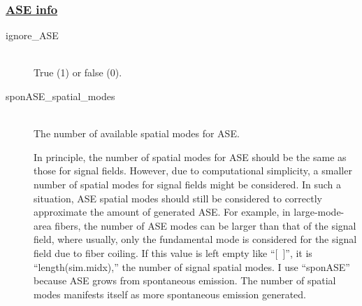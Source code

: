 \documentclass[12pt,hidelinks]{book}
\begin{document}
\subsubsection{\underline{ASE info}}
\begin{description}
\item[\color{blue}ignore\_ASE]\mbox{}\\
True (1) or false (0).

\item[\color{blue}sponASE\_spatial\_modes]\mbox{}\\
The number of available spatial modes for ASE.

In principle, the number of spatial modes for ASE should be the same as those for signal fields. However, due to computational simplicity, a smaller number of spatial modes for signal fields might be considered. In such a situation, ASE spatial modes should still be considered to correctly approximate the amount of generated ASE. For example, in large-mode-area fibers, the number of ASE modes can be larger than that of the signal field, where usually, only the fundamental mode is considered for the signal field due to fiber coiling. If this value is left empty like ``[~]'', it is ``length(sim.midx),'' the number of signal spatial modes. I use ``sponASE'' because ASE grows from spontaneous emission. The number of spatial modes manifests itself as more spontaneous emission generated.
\end{description}
\end{document}
